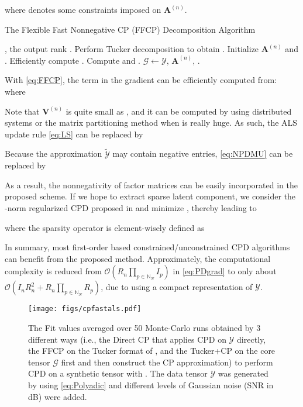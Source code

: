 \documentclass[10pt,twocolumn,twoside]{IEEEtran}
\newcommand{\tensor}[1]{\ensuremath{\boldsymbol{\mathscr{#1}}}}
\newcommand{\matn}[2][n]{\ensuremath{\mathbf{#2}^{(#1)}}}
\newcommand{\Natural}{\ensuremath{\mathbb{N}}}
\renewcommand{\from}{\ensuremath{\leftarrow}}
\newcommand{\bigO}[1]{\ensuremath{\mathcal{O}(#1)}}
\begin{document}
where  denotes some constraints imposed on \matn{A}. 

\begin{algorithm}[!t]
\caption{The Flexible Fast Nonnegative CP (FFCP) Decomposition Algorithm}
\label{alg:FFCP}
\begin{algorithmic}[1]
 \REQUIRE , the output rank .
 \STATE Perform Tucker decomposition to obtain . Initialize \matn{A} and .
 \REPEAT 
 \FOR {}
 \STATE Efficiently compute .
\STATE Compute  and . 
 \ENDFOR
{}
\RETURN \tensor{G}\from\tensor{Y}, \matn{A}, .
\end{algorithmic}
\end{algorithm} 


With \eqref{eq:FFCP}, the term  in the gradient  can be efficiently computed from: 
where

Note that \matn{V} is quite small as , and  it can be computed by using distributed systems or the matrix partitioning method when  is really huge. 
As such, the ALS update rule \eqref{eq:LS} can be replaced by

Because the approximation \tensor{\tilde{Y}} may contain negative entries, \eqref{eq:NPDMU} can be replaced by

As a result, the nonnegativity of factor matrices can be easily incorporated in the proposed scheme. If we hope to extract sparse latent component, we consider the -norm regularized CPD proposed in \cite{CP_L1} and minimize , thereby leading to

where the sparsity operator  is element-wisely defined as

 In summary, most first-order based constrained/unconstrained CPD algorithms can benefit from the proposed method. Approximately, the computational complexity is reduced from \bigO{R_n\prod_{p\in\Natural_N}I_p} in \eqref{eq:PDgrad} to only  about \bigO{I_nR_n^2+R_n\prod_{p\in\Natural_N}R_p}, due to using a compact representation of \tensor{Y}. 
 
 \begin{figure}[!t]
\centerline{
    \texttt{[image: figs/cpfastals.pdf]}
}
\caption{The Fit values averaged over 50 Monte-Carlo runs obtained by 3 different ways (i.e., the Direct CP that applies CPD on \tensor{Y} directly, the FFCP on the Tucker format of , and the Tucker+CP on the core tensor \tensor{G} first and then construct the CP approximation) to perform CPD on a synthetic tensor  with . The data tensor \tensor{Y} was generated by using \eqref{eq:Polyadic} and different levels of Gaussian noise (SNR in dB) were added.}
\label{fig:3Ways}
\end{figure}
\end{document}
